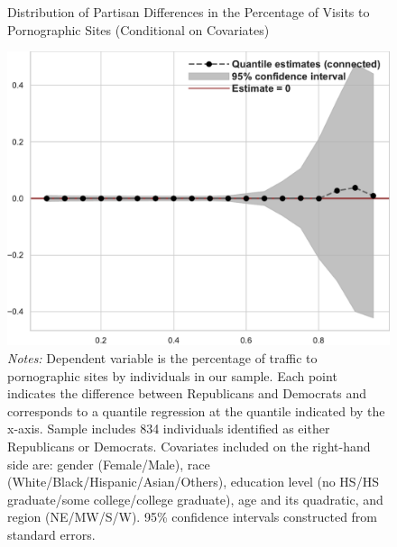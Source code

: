 \documentclass[12pt, letterpaper]{article}
\begin{document}
\begin{figure}
	\centering
	\caption{Distribution of Partisan Differences in the Percentage of Visits to Pornographic Sites (Conditional on Covariates)}
	\includegraphics[width=.55\linewidth]{../figs/quantile_reg_covariates_proportion_visits_adult.pdf}
	\caption*{\footnotesize \emph{Notes:} 
		Dependent variable is the percentage of traffic to pornographic sites by individuals in our sample.
		Each point indicates the difference between Republicans and Democrats and corresponds to a quantile regression at the quantile indicated by the x-axis.
		Sample includes 834 individuals identified as either Republicans or Democrats.
		Covariates included on the right-hand side are: gender (Female/Male), race (White/Black/Hispanic/Asian/Others), education level (no HS/HS graduate/some college/college graduate), age and its quadratic, and region (NE/MW/S/W).
		95\% confidence intervals constructed from standard errors.
	}
	\label{fig:quantile_regression_prop_visits_covariates}
\end{figure}
\end{document}
